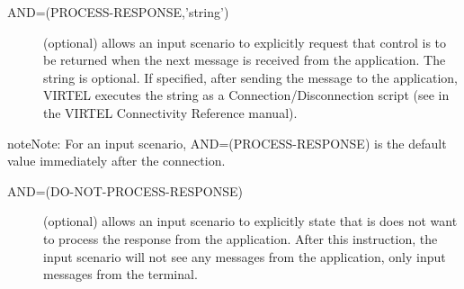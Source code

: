 \documentclass[letterpaper,10pt,english]{sphinxmanual}
\begin{document}
\begin{description}
\item[{AND=(PROCESS-RESPONSE,’string’)}] \leavevmode
(optional) allows an input scenario to explicitly request that control is to be returned when the next message is received from the application. The string is optional. If specified, after sending the message to the application, VIRTEL executes the string as a Connection/Disconnection script (see  in the VIRTEL Connectivity Reference manual).

\end{description}

\begin{sphinxadmonition}{note}{Note:}
For an input scenario, AND=(PROCESS-RESPONSE) is the default value immediately after the connection.
\end{sphinxadmonition}
\begin{description}
\item[{AND=(DO-NOT-PROCESS-RESPONSE)}] \leavevmode
(optional) allows an input scenario to explicitly state that is does not want to process the response from the application. After this instruction, the input scenario will not see any messages from the application, only input messages from the terminal.

\end{description}
\end{document}
